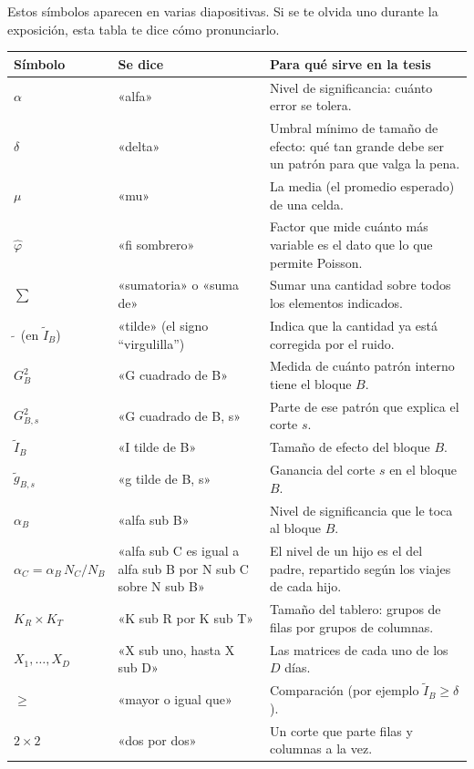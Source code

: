 \documentclass[11pt,a4paper]{article}
\begin{document}
Estos símbolos aparecen en varias diapositivas. Si se te olvida uno durante la exposición, esta tabla te dice cómo pronunciarlo.

\begin{center}
\small
\begin{longtable}{@{}>{\centering\arraybackslash}p{2.6cm}>{\raggedright\arraybackslash}p{4.8cm}>{\raggedright\arraybackslash}p{8.0cm}@{}}
\toprule
\textbf{Símbolo} & \textbf{Se dice} & \textbf{Para qué sirve en la tesis} \\
\midrule
\endhead
$\alpha$ & «alfa» & Nivel de significancia: cuánto error se tolera. \\
$\delta$ & «delta» & Umbral mínimo de tamaño de efecto: qué tan grande debe ser un patrón para que valga la pena. \\
$\mu$ & «mu» & La media (el promedio esperado) de una celda. \\
$\hat\varphi$ & «fi sombrero» & Factor que mide cuánto más variable es el dato que lo que permite Poisson. \\
$\sum$ & «sumatoria» o «suma de» & Sumar una cantidad sobre todos los elementos indicados. \\
$\tilde{\ }$ (en $\tilde I_B$) & «tilde» (el signo ``virgulilla'') & Indica que la cantidad ya está corregida por el ruido. \\
$G^2_B$ & «G cuadrado de B» & Medida de cuánto patrón interno tiene el bloque $B$. \\
$G^2_{B,s}$ & «G cuadrado de B, s» & Parte de ese patrón que explica el corte $s$. \\
$\tilde I_B$ & «I tilde de B» & Tamaño de efecto del bloque $B$. \\
$\tilde g_{B,s}$ & «g tilde de B, s» & Ganancia del corte $s$ en el bloque $B$. \\
$\alpha_B$ & «alfa sub B» & Nivel de significancia que le toca al bloque $B$. \\
$\alpha_C=\alpha_B\,N_C/N_B$ & «alfa sub C es igual a alfa sub B por N sub C sobre N sub B» & El nivel de un hijo es el del padre, repartido según los viajes de cada hijo. \\
$K_R\times K_T$ & «K sub R por K sub T» & Tamaño del tablero: grupos de filas por grupos de columnas. \\
$X_1,\dots,X_D$ & «X sub uno, hasta X sub D» & Las matrices de cada uno de los $D$ días. \\
$\ge$ & «mayor o igual que» & Comparación (por ejemplo $\tilde I_B\ge\delta$). \\
$2\times2$ & «dos por dos» & Un corte que parte filas y columnas a la vez. \\

\end{longtable}
\end{center}
\end{document}
